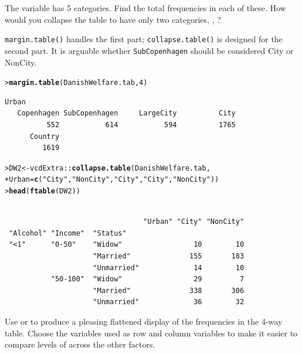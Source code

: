 \documentclass[11pt]{report}\usepackage[]{graphicx}\usepackage[]{color}
\makeatletter
\newcommand{\hlnum}[1]{\textcolor[rgb]{0.686,0.059,0.569}{#1}}%
\newcommand{\hlstr}[1]{\textcolor[rgb]{0.192,0.494,0.8}{#1}}%
\newcommand{\hlopt}[1]{\textcolor[rgb]{0,0,0}{#1}}%
\newcommand{\hlstd}[1]{\textcolor[rgb]{0.345,0.345,0.345}{#1}}%
\newcommand{\hlkwb}[1]{\textcolor[rgb]{0.69,0.353,0.396}{#1}}%
\newcommand{\hlkwc}[1]{\textcolor[rgb]{0.333,0.667,0.333}{#1}}%
\newcommand{\hlkwd}[1]{\textcolor[rgb]{0.737,0.353,0.396}{\textbf{#1}}}%
\newenvironment{kframe}{%
 \def\at@end@of@kframe{}%
 \ifinner\ifhmode%
  \def\at@end@of@kframe{\end{minipage}}%
  \begin{minipage}{\columnwidth}%
 \fi\fi%
 \def\FrameCommand##1{\hskip\@totalleftmargin \hskip-\fboxsep
 \colorbox{shadecolor}{##1}\hskip-\fboxsep
     \hskip-\linewidth \hskip-\@totalleftmargin \hskip\columnwidth}%
 \MakeFramed {\advance\hsize-\width
   \@totalleftmargin\z@ \linewidth\hsize
   \@setminipage}}%
 {\par\unskip\endMakeFramed%
 \at@end@of@kframe}
\newenvironment{knitrout}{}{} %
\renewenvironment{knitrout}{\small\renewcommand{\baselinestretch}{.85}}{} %
\makeatother
\begin{document}
\begin{Exercises}
\begin{enumerate*}
    \item The variable  has 5 categories.  Find the total frequencies
    in each of these.  How would you collapse the table to have only
    two categories, , ?
    \begin{ans}
      \texttt{margin.table()} handles the first part; \texttt{collapse.table()} is designed for the second part. 
      It is arguable whether
      \texttt{SubCopenhagen} should be considered City or NonCity.
\begin{knitrout}
\color{fgcolor}\begin{kframe}
\begin{alltt}
\hlstd{> }\hlkwd{margin.table}\hlstd{(DanishWelfare.tab,} \hlnum{4}\hlstd{)}
\end{alltt}
\begin{verbatim}
Urban
   Copenhagen SubCopenhagen     LargeCity          City 
          552           614           594          1765 
      Country 
         1619 
\end{verbatim}
\begin{alltt}
\hlstd{> }\hlstd{DW2} \hlkwb{<-} \hlstd{vcdExtra}\hlopt{::}\hlkwd{collapse.table}\hlstd{(DanishWelfare.tab,}
\hlstd{+ }                                \hlkwc{Urban}\hlstd{=}\hlkwd{c}\hlstd{(}\hlstr{"City"}\hlstd{,}\hlstr{"NonCity"}\hlstd{,}\hlstr{"City"}\hlstd{,}\hlstr{"City"}\hlstd{,}\hlstr{"NonCity"}\hlstd{))}
\hlstd{> }\hlkwd{head}\hlstd{(}\hlkwd{ftable}\hlstd{(DW2))}
\end{alltt}
\begin{verbatim}
                                                         
                                 "Urban" "City" "NonCity"
 "Alcohol" "Income"  "Status"                            
 "<1"      "0-50"    "Widow"                 10        10
                     "Married"              155       183
                     "Unmarried"             14        10
           "50-100"  "Widow"                 29         7
                     "Married"              338       306
                     "Unmarried"             36        32
\end{verbatim}
\end{kframe}
\end{knitrout}
    \end{ans}
    
    \item Use  or  to produce a pleasing
    flattened display of the frequencies in the 4-way table.  Choose the
    variables used as row and column variables to make it easier to compare
    levels of  across the other factors.
    \begin{ans}
    \end{ans}
    

\end{enumerate*}
\end{Exercises}
\end{document}
